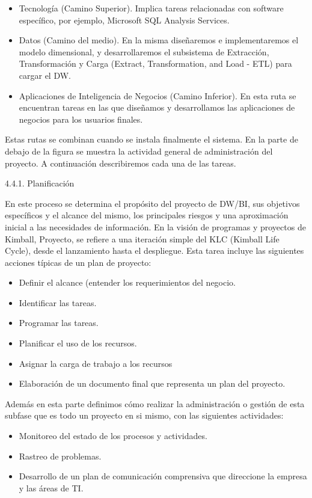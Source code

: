 \documentclass[%
 reprint,
 amsmath,amssymb,
 aps,
]{revtex4-1}
\begin{document}
\begin{itemize}
	\item Tecnología (Camino Superior). Implica tareas relacionadas con software específico, por ejemplo, Microsoft SQL Analysis Services.
	\item Datos (Camino del medio). En la misma diseñaremos e implementaremos el modelo dimensional, y desarrollaremos el subsistema de Extracción, Transformación y Carga (Extract, Transformation, and Load - ETL) para cargar el DW.
	\item Aplicaciones de Inteligencia de Negocios (Camino Inferior). En esta ruta se encuentran tareas en las que diseñamos y desarrollamos las aplicaciones de negocios para los usuarios finales.
\end{itemize}

Estas rutas se combinan cuando se instala finalmente el sistema.
En la parte de debajo de la figura se muestra la actividad general de administración del proyecto. A continuación describiremos cada una de las tareas.\cite{estrella7}

4.4.1. Planificación

En este proceso se determina el propósito del proyecto de DW/BI, sus objetivos específicos y el alcance del mismo, los principales riesgos y una aproximación inicial a las necesidades de información.
En la visión de programas y proyectos de Kimball, Proyecto, se refiere a una iteración simple del KLC (Kimball Life Cycle), desde el lanzamiento hasta el despliegue.
Esta tarea incluye las siguientes acciones típicas de un plan de proyecto:

\begin{itemize}
	\item Definir el alcance (entender los requerimientos del negocio.
	\item Identificar las tareas.
	\item Programar las tareas.
	\item Planificar el uso de los recursos.
	\item Asignar la carga de trabajo a los recursos
	\item Elaboración de un documento final que representa un plan del proyecto.
\end{itemize}
Además en esta parte definimos cómo realizar la administración o gestión de esta subfase que es todo un proyecto en si mismo, con las siguientes actividades: 

\begin{itemize}
	\item Monitoreo del estado de los procesos y actividades.
	\item Rastreo de problemas.
	\item Desarrollo de un plan de comunicación comprensiva que direccione la empresa y las áreas de TI.
\end{itemize}
\end{document}
